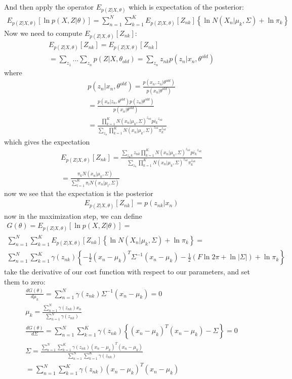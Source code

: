 \documentclass[12pt,twoside]{article}
\begin{document}
And then apply the operator $E_{p(Z|X,\theta)}$ which is expectation of the posterior:
\begin{align}
E_{p(Z|X,\theta)} [\ln p(X, Z|\theta)] = \sum_{n=1}^{N} \sum_{k=1}^{K} E_{p(Z|X,\theta)} [Z_{nk}] \left\lbrace\ln N(X_n | \mu_k, \Sigma) + \ln \pi_k \right\rbrace
\end{align}
Now we need to compute $E_{p(Z|X,\theta)} [Z_{nk}]$:
\begin{align}
E_{p(Z|X,\theta)} [Z_{nk}] = E_{p(Z|X,\theta)} [Z_{nk}] \\
= \sum_{z_1}... \sum_{z_n} p(Z|X, \theta_{old}) = \sum_{z_n} z_{nk} p(z_n|x_n, \theta^{old})
\end{align}
where
\begin{align}
p(z_n|x_n, \theta^{old}) = \frac{p(x_n, z_n | \theta^{old})}{p(x_n|\theta^{old})} \\
=  \frac{p(x_n |z_n, \theta^{old})p(z_n|\theta^{old})}{p(x_n|\theta^{old})}\\
= \frac{\prod_{k=1}^{K}N(x_n|\mu_k, \Sigma)^{z_{nk}}{pi_k}^{z_{nk}}}{\sum_{z_n}\prod_{k=1}^{K} N(x_n|\mu_k, \Sigma)^{z_{nk}}\pi_k^{z_{nk}}}
\end{align}
which gives the expectation
\begin{align}
E_{p(Z|X,\theta)} [Z_{nk}] = \frac{\sum_{z_nk} z_{nk} \prod_{k=1}^{K}N(x_n|\mu_k, \Sigma)^{z_{nk}}{pi_k}^{z_{nk}}}{\sum_{z_n}\prod_{k=1}^{K} N(x_n|\mu_k, \Sigma)^{z_{nk}}\pi_k^{z_{nk}}} \\
= \frac{\pi_k N(x_n|\mu_k, \Sigma)}{\sum_{l=1}^{K} \pi_l N(x_n|\mu_l, \Sigma)}
\end{align}
now we see that the expectation is the posterior
\begin{align}
E_{p(Z|X,\theta)} [Z_{nk}] = p(z_{nk}|x_n)
\end{align}
now in the maximization step, we can define
\begin{align}
G(\theta) = E_{p(Z|X,\theta)} [\ln p(X, Z|\theta)] = \\
\sum_{n=1}^{N} \sum_{k=1}^{K} E_{p(Z|X,\theta)} [Z_{nk}] \left\lbrace\ln N(X_n | \mu_k, \Sigma) + \ln \pi_k \right\rbrace =\\
\sum_{n=1}^{N} \sum_{k=1}^{K} \gamma(z_{nk}) \left\lbrace -\frac{1}{2}(x_n - \mu_k)^T \Sigma^{-1}(x_n - \mu_k) -\frac{1}{2}(F\ln 2\pi + \ln |\Sigma |) + \ln \pi_k  \right\rbrace
\end{align}
take the derivative of our cost function with respect to our parameters, and set them to zero:
\begin{align}
\frac{d G(\theta)}{d \mu_k} = \sum_{n=1}^N  \gamma(z_{nk})\Sigma^{-1}(x_n - \mu_k) = 0 \\
\mu_k = \frac{\sum_{n=1}^N  \gamma(z_{nk}) x_n}{\sum_{n=1}^N  \gamma(z_{nk})}\\
\frac{d G(\theta)}{d \Sigma} = \sum_{n=1}^{N} \sum_{k=1}^{K} \gamma(z_{nk})\left\lbrace (x_n - \mu_k)^T (x_n - \mu_k) - \Sigma \right\rbrace = 0\\
\Sigma = \frac{\sum_{n=1}^{N} \sum_{k=1}^{K} \gamma(z_{nk})(x_n - \mu_k)^T (x_n - \mu_k) }{\sum_{n=1}^{N} \sum_{k=1}^{K} \gamma(z_{nk})} \\
= \sum_{n=1}^{N} \sum_{k=1}^{K} \gamma(z_{nk})(x_n - \mu_k)^T (x_n - \mu_k) 
\end{align}
\end{document}
